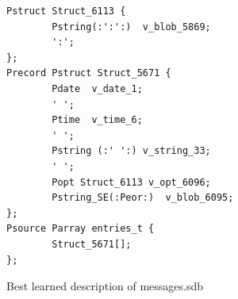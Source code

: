 \begin{figure}[t]
\centering
{\footnotesize
\begin{verbatim}
Pstruct Struct_6113 {
        Pstring(:':':)  v_blob_5869;
        ':';
};
Precord Pstruct Struct_5671 {
        Pdate  v_date_1;
        ' ';
        Ptime  v_time_6;
        ' ';
        Pstring (:' ':) v_string_33;
        ' ';
        Popt Struct_6113 v_opt_6096;
        Pstring_SE(:Peor:)  v_blob_6095;
};
Psource Parray entries_t {
        Struct_5671[];
};
\end{verbatim}
}
\caption{Best learned description of messages.sdb}
\label{fig:best-messages.sdb}
\end{figure}

